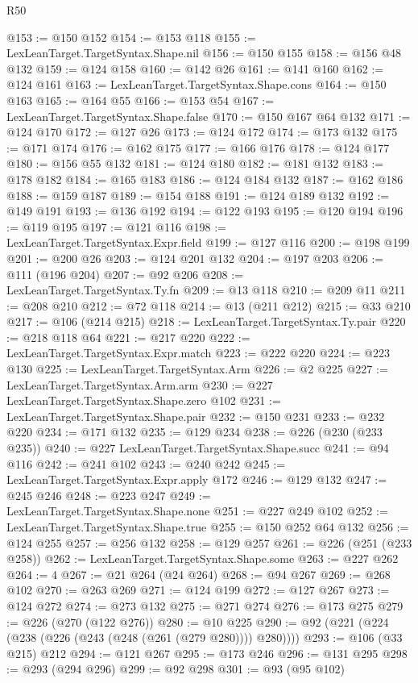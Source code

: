 \begin{lexlean}{R50}
\begin{coremodule}
@153 := @150 @152
@154 := @153 @118
@155 := LexLeanTarget.TargetSyntax.Shape.nil
@156 := @150 @155
@158 := @156 @48 @132
@159 := @124 @158
@160 := @142 @26
@161 := @141 @160
@162 := @124 @161
@163 := LexLeanTarget.TargetSyntax.Shape.cons
@164 := @150 @163
@165 := @164 @55
@166 := @153 @54
@167 := LexLeanTarget.TargetSyntax.Shape.false
@170 := @150 @167 @64 @132
@171 := @124 @170
@172 := @127 @26
@173 := @124 @172
@174 := @173 @132
@175 := @171 @174
@176 := @162 @175
@177 := @166 @176
@178 := @124 @177
@180 := @156 @55 @132
@181 := @124 @180
@182 := @181 @132
@183 := @178 @182
@184 := @165 @183
@186 := @124 @184 @132
@187 := @162 @186
@188 := @159 @187
@189 := @154 @188
@191 := @124 @189 @132
@192 := @149 @191
@193 := @136 @192
@194 := @122 @193
@195 := @120 @194
@196 := @119 @195
@197 := @121 @116
@198 := LexLeanTarget.TargetSyntax.Expr.field
@199 := @127 @116
@200 := @198 @199
@201 := @200 @26
@203 := @124 @201 @132
@204 := @197 @203
@206 := @111 (@196 @204)
@207 := @92 @206
@208 := LexLeanTarget.TargetSyntax.Ty.fn
@209 := @13 @118
@210 := @209 @11
@211 := @208 @210
@212 := @72 @118
@214 := @13 (@211 @212)
@215 := @33 @210
@217 := @106 (@214 @215)
@218 := LexLeanTarget.TargetSyntax.Ty.pair
@220 := @218 @118 @64
@221 := @217 @220
@222 := LexLeanTarget.TargetSyntax.Expr.match
@223 := @222 @220
@224 := @223 @130
@225 := LexLeanTarget.TargetSyntax.Arm
@226 := @2 @225
@227 := LexLeanTarget.TargetSyntax.Arm.arm
@230 := @227 LexLeanTarget.TargetSyntax.Shape.zero @102
@231 := LexLeanTarget.TargetSyntax.Shape.pair
@232 := @150 @231
@233 := @232 @220
@234 := @171 @132
@235 := @129 @234
@238 := @226 (@230 (@233 @235))
@240 := @227 LexLeanTarget.TargetSyntax.Shape.succ
@241 := @94 @116
@242 := @241 @102
@243 := @240 @242
@245 := LexLeanTarget.TargetSyntax.Expr.apply @172
@246 := @129 @132
@247 := @245 @246
@248 := @223 @247
@249 := LexLeanTarget.TargetSyntax.Shape.none
@251 := @227 @249 @102
@252 := LexLeanTarget.TargetSyntax.Shape.true
@255 := @150 @252 @64 @132
@256 := @124 @255
@257 := @256 @132
@258 := @129 @257
@261 := @226 (@251 (@233 @258))
@262 := LexLeanTarget.TargetSyntax.Shape.some
@263 := @227 @262
@264 := 4
@267 := @21 @264 (@24 @264)
@268 := @94 @267
@269 := @268 @102
@270 := @263 @269
@271 := @124 @199
@272 := @127 @267
@273 := @124 @272
@274 := @273 @132
@275 := @271 @274
@276 := @173 @275
@279 := @226 (@270 (@122 @276))
@280 := @10 @225
@290 := @92 (@221 (@224 (@238 (@226 (@243 (@248 (@261 (@279 @280)))) @280))))
@293 := @106 (@33 @215) @212
@294 := @121 @267
@295 := @173 @246
@296 := @131 @295
@298 := @293 (@294 @296)
@299 := @92 @298
@301 := @93 (@95 @102)

\end{coremodule}
\end{lexlean}
